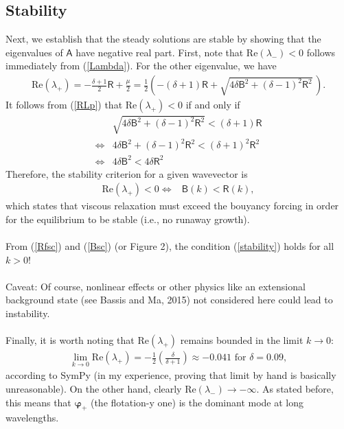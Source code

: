 \documentclass[paper=a4, fontsize=11pt]{article} %
\begin{document}
\subsection{Stability}
Next, we establish that the steady solutions are stable by showing that the
eigenvalues of $\mathsf{A}$ have negative real part.
First, note that $\mathrm{Re}(\lambda_-)<0$ follows immediately
from  (\ref{Lambda}).
For the other eigenvalue, we have
\begin{align}
\mathrm{Re}(\lambda_+) = -\frac{\delta+1}{2}\mathsf{R} + \frac{\mu}{2}
= \frac{1}{2}\left(-(\delta+1)\mathsf{R}+\sqrt{4\delta\mathsf{B}^2 + (\delta-1)^2\mathsf{R}^2 } \,\right). \label{RLp}
\end{align}
It follows from (\ref{RLp}) that $\mathrm{Re}(\lambda_+)<0$ if and only if
\begin{align}
&\sqrt{4\delta\mathsf{B}^2 + (\delta-1)^2\mathsf{R}^2 } < (\delta+1)\mathsf{R} \\
\iff &4\delta\mathsf{B}^2 + (\delta-1)^2\mathsf{R}^2 < (\delta+1)^2 \mathsf{R}^2 \\
\iff &4\delta\mathsf{B}^2 < 4\delta \mathsf{R}^2
\end{align}
Therefore, the stability criterion for a given wavevector is
\begin{align}
\mathrm{Re}(\lambda_+)<0  \iff &\mathsf{B}(k) < \mathsf{R}(k), \label{stability}
\end{align}
which states that viscous relaxation must exceed the bouyancy forcing
in order for the equilibrium to be stable (i.e., no runaway growth). \\ \\
{From (\ref{Rfsc}) and (\ref{Bsc}) (or Figure 2),
the condition (\ref{stability}) holds for all $k> 0$!}
\\ \\
Caveat: Of course, nonlinear
effects or other physics like an extensional background state (see Bassis and Ma, 2015)
not considered here could lead to instability.
\\ \\
Finally, it is worth noting that $\mathrm{Re}(\lambda_+)$
remains bounded in the limit $k\to 0$:
\begin{align}
\lim_{k\to 0 }\mathrm{Re}(\lambda_+) = - \frac{1}{2}\left(\frac{\delta}{\delta+1}\right) \approx -0.041 \text{ for } \delta=0.09,
\end{align}
according to SymPy (in my experience, proving that limit by hand is basically unreasonable).
On the other hand, clearly $\mathrm{Re}(\lambda_-)\to-\infty$. As stated before,
this means that $\pmb{\varphi}_+$ (the flotation-y one) is the dominant mode at long wavelengths.
\end{document}

